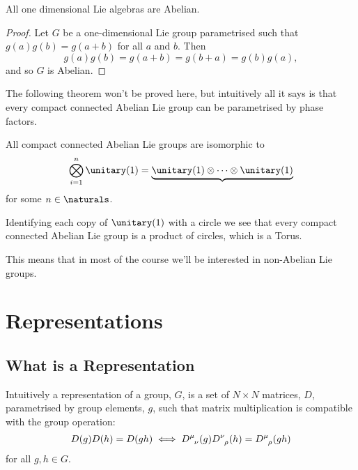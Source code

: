 \documentclass[fleqn]{NotesClass}
\begin{document}
    \begin{crl}{}{}
        All one dimensional Lie algebras are Abelian.
        \begin{proof}
            Let \(G\) be a one-dimensional Lie group parametrised such that \(g(a)g(b) = g(a + b)\) for all \(a\) and \(b\).
            Then
            \begin{equation}
                g(a)g(b) = g(a + b) = g(b + a) = g(b)g(a),
            \end{equation}
            and so \(G\) is Abelian.
        \end{proof}
    \end{crl}
    
    The following theorem won't be proved here, but intuitively all it says is that every compact connected Abelian Lie group can be parametrised by phase factors.
    \begin{thm}{}{}
        All compact connected Abelian Lie groups are isomorphic to
        \begin{equation}
            \bigotimes_{i = 1}^{n} \unitary(1) = \underbrace{\unitary(1) \otimes \dotsb \otimes \unitary(1)}
        \end{equation}
        for some \(n \in \naturals\).
    \end{thm}
    Identifying each copy of \(\unitary(1)\) with a circle we see that every compact connected Abelian Lie group is a product of circles, which is a Torus.
    
    This means that in most of the course we'll be interested in non-Abelian Lie groups.
    
    \chapter{Representations}
    \section{What is a Representation}
    Intuitively a representation of a group, \(G\), is a set of \(N \times N\) matrices, \(D\), parametrised by group elements, \(g\), such that matrix multiplication is compatible with the group operation:
    \begin{equation}
        D(g) D(h) = D(gh) \iff \tensor{D}{^\mu_\nu}(g) \tensor{D}{^\nu_\rho}(h) = \tensor{D}{^\mu_\rho}(g h)
    \end{equation}
    for all \(g, h \in G\).
    
\end{document}
